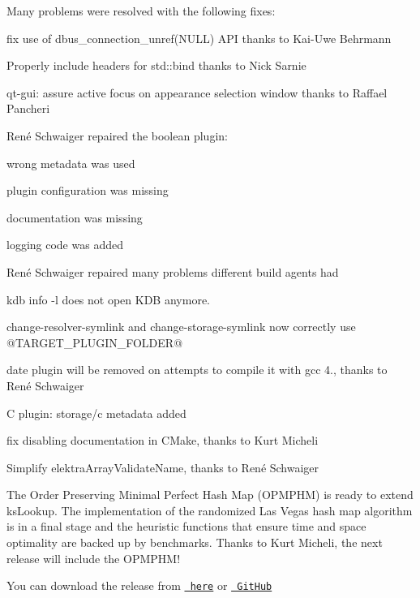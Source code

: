 Many problems were resolved with the following fixes\+:


\begin{DoxyItemize}
\item fix use of {\ttfamily dbus\+\_\+connection\+\_\+unref(\+N\+U\+L\+L)} A\+PI thanks to Kai-\/\+Uwe Behrmann
\item Properly include headers for {\ttfamily std\+::bind} thanks to Nick Sarnie
\item qt-\/gui\+: assure active focus on appearance selection window thanks to Raffael Pancheri
\item René Schwaiger repaired the {\ttfamily boolean} plugin\+:
\begin{DoxyItemize}
\item wrong metadata was used
\item plugin configuration was missing
\item documentation was missing
\item logging code was added
\end{DoxyItemize}
\item René Schwaiger repaired many problems different build agents had
\item {\ttfamily kdb info -\/l} does not open {\ttfamily K\+DB} anymore.
\item {\ttfamily change-\/resolver-\/symlink} and {\ttfamily change-\/storage-\/symlink} now correctly use {\ttfamily @T\+A\+R\+G\+E\+T\+\_\+\+P\+L\+U\+G\+I\+N\+\_\+\+F\+O\+L\+D\+ER@}
\item date plugin will be removed on attempts to compile it with gcc 4., thanks to René Schwaiger
\item C plugin\+: storage/c metadata added
\item fix disabling documentation in C\+Make, thanks to Kurt Micheli
\item Simplify {\ttfamily elektra\+Array\+Validate\+Name}, thanks to René Schwaiger
\end{DoxyItemize}

The Order Preserving Minimal Perfect Hash Map (O\+P\+M\+P\+HM) is ready to extend {\ttfamily ks\+Lookup}. The implementation of the randomized Las Vegas hash map algorithm is in a final stage and the heuristic functions that ensure time and space optimality are backed up by benchmarks. Thanks to Kurt Micheli, the next release will include the O\+P\+M\+P\+H\+M!

You can download the release from \href{https://www.libelektra.org/ftp/elektra/releases/elektra-0.8.21.tar.gz}{\texttt{ here}} or \href{https://github.com/ElektraInitiative/ftp/blob/master/releases/elektra-0.8.21.tar.gz?raw=true}{\texttt{ Git\+Hub}}

